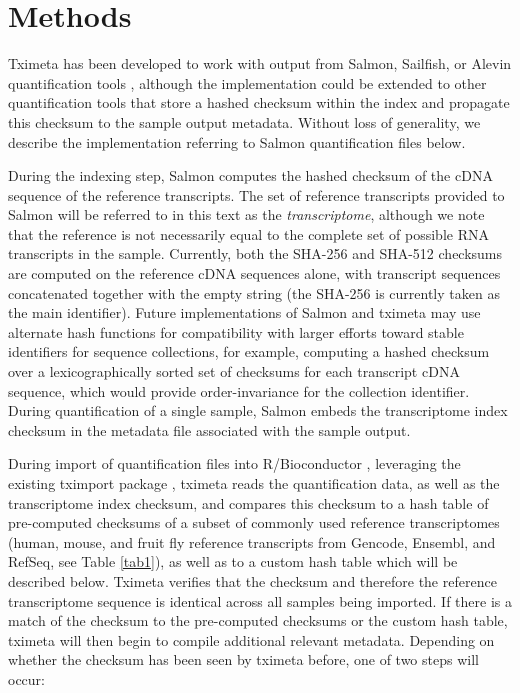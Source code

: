 \documentclass[12pt]{article}
\begin{document}
\section*{Methods}

Tximeta has been developed to work with output from Salmon, Sailfish, or Alevin quantification tools \citep{sailfish,salmon,alevin}, although the implementation could be extended to other quantification tools that store a hashed checksum within the index and propagate this checksum to the sample output metadata. Without loss of generality, we describe the implementation referring to Salmon quantification files below.

During the indexing step, Salmon computes the hashed checksum of the cDNA sequence of the reference transcripts. The set of reference transcripts provided to Salmon will be referred to in this text as the \textit{transcriptome}, although we note that the reference is not necessarily equal to the complete set of possible RNA transcripts in the sample. Currently, both the SHA-256 and SHA-512 \citep{sha1} checksums are computed on the reference cDNA sequences alone, with transcript sequences concatenated together with the empty string (the SHA-256 is currently taken as the main identifier). Future implementations of Salmon and tximeta may use alternate hash functions for compatibility with larger efforts toward stable identifiers for sequence collections, for example, computing a hashed checksum over a lexicographically sorted set of checksums for each transcript cDNA sequence, which would provide order-invariance for the collection identifier. During quantification of a single sample, Salmon embeds the transcriptome index checksum in the metadata file associated with the sample output. 

During import of quantification files into R/Bioconductor \citep{bioc}, leveraging the existing tximport package \citep{tximport}, tximeta reads the quantification data, as well as the transcriptome index checksum, and compares this checksum to a hash table of pre-computed checksums of a subset of commonly used reference transcriptomes (human, mouse, and fruit fly reference transcripts from Gencode, Ensembl, and RefSeq, see Table \ref{tab1}), as well as to a custom hash table which will be described below. Tximeta verifies that the checksum and therefore the reference transcriptome sequence is identical across all samples being imported. If there is a match of the checksum to the pre-computed checksums or the custom hash table, tximeta will then begin to compile additional relevant metadata. Depending on whether the checksum has been seen by tximeta before, one of two steps will occur:
\end{document}
